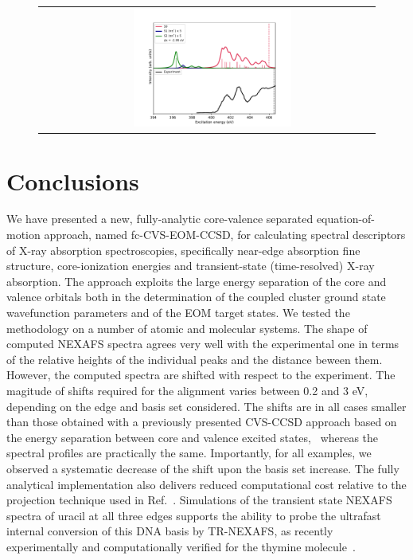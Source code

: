 \documentclass[journal=jctcce,manuscript=article]{achemso}
\begin{document}
\begin{figure}[H]
\begin{tabular}{cc}
&
\includegraphics[width=0.5\textwidth]{Spectra/Dbs_Uracil_Sn_N_zoom.pdf}
\\
\end{tabular}
\end{figure}


\section{Conclusions}
We have presented a new, fully-analytic core-valence separated equation-of-motion approach,
named fc-CVS-EOM-CCSD, for calculating spectral descriptors of X-ray absorption spectroscopies, specifically near-edge absorption fine structure, core-ionization energies and transient-state (time-resolved) X-ray absorption. The approach exploits the large energy separation of the core and valence orbitals both in the determination of the coupled cluster ground state wavefunction parameters and of the EOM target states.
We tested the methodology on a number of atomic and molecular systems. The shape of computed NEXAFS spectra agrees very well with the experimental one in terms of the relative heights of the individual peaks and the distance beween them. However, the computed spectra are shifted with respect to the experiment. The magitude of shifts required for the alignment varies between 0.2 and 3 eV, depending on the edge and basis set considered.
The shifts are in all cases smaller than those obtained with a previously presented CVS-CCSD approach based on the energy separation between core and valence excited states,~\cite{coriani2015jcp} whereas the spectral profiles are practically the same. Importantly, for all examples, we observed a systematic decrease of the shift upon the basis set increase.
The fully analytical implementation also delivers reduced computational 
cost relative to the projection technique used in Ref.~.
Simulations of the transient state NEXAFS spectra of uracil at all three edges 
supports the ability to probe the ultrafast internal conversion of this DNA basis by 
TR-NEXAFS, as recently experimentally and computationally verified for the thymine molecule~\cite{naturecomm}.
\end{document}
